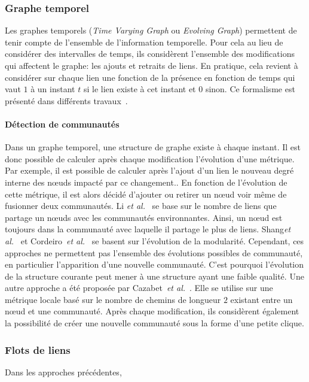 \subsubsection{Graphe temporel}
Les graphes temporels (\emph{Time Varying Graph} ou \emph{Evolving Graph})
permettent de tenir compte de l'ensemble de l'information temporelle.
Pour cela au lieu de considérer des intervalles de temps, ils considèrent l'ensemble des modifications qui affectent le graphe: les ajouts et retraits de liens.
En pratique, cela revient à considérer sur chaque lien une fonction de la présence en fonction de temps qui vaut $1$ à un instant $t$ si le lien existe à cet instant et $0$ sinon.
Ce formalisme est présenté dans différents travaux~\cite{Casteigts2011,Wehmuth2014}.

\paragraph{Détection de communautés}
Dans un graphe temporel, une structure de graphe existe à chaque instant.
Il est donc possible de calculer après chaque modification l'évolution d'une métrique.
Par exemple, il est possible de calculer après l'ajout d'un lien le nouveau degré interne des n\oe uds impacté par ce changement..
En fonction de l'évolution de cette métrique, il est alors décidé d'ajouter ou retirer un n\oe ud voir même de fusionner deux communautés.
Li \emph{et al.}~\cite{Li2012a} se base sur le nombre de liens que partage un n\oe uds avec les communautés environnantes.
Ainsi, un n\oe ud est toujours dans la communauté avec laquelle il partage le plus de liens.
Shang\emph{et al.}~\cite{Shang2014a} et Cordeiro~\emph{et al.}~\cite{Cordeiro2016} se basent sur l'évolution de la modularité.
Cependant, ces approches ne permettent pas l'ensemble des évolutions possibles de communauté, en particulier l'apparition d'une nouvelle communauté.
C'est pourquoi l'évolution de la structure courante peut mener à une structure ayant une faible qualité.
Une autre approche a été proposée par Cazabet~\emph{et al.}~\cite{Cazabet2010}.
Elle se utilise sur une métrique locale basé sur le nombre de chemins de longueur $2$ existant entre un n\oe ud et une communauté.
Après chaque modification, ils considèrent également la possibilité de créer une nouvelle communauté sous la forme d'une petite clique.



\subsubsection{Flots de liens}
Dans les approches précédentes, 

